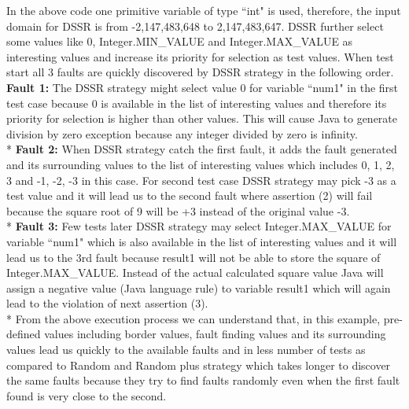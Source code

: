 \documentclass[conference]{IEEEtran}
\begin{document}
\endgroup
In the above code one primitive variable of type ``int" is used, therefore, the input domain for DSSR is from -2,147,483,648 to 2,147,483,647. DSSR further select some values like 0, Integer.MIN\_VALUE and Integer.MAX\_VALUE as interesting values and increase its priority for selection as test values. 
When test start all 3 faults are quickly discovered by DSSR strategy in the following order.\\
\indent \textbf{Fault 1:} The DSSR strategy might select value 0 for variable ``num1"  in the first test case because 0 is available in the list of interesting values and therefore its priority for selection is higher than other values. This will cause Java to generate division by zero exception because any integer divided by zero is infinity.\\*
\indent \textbf{Fault 2:} When DSSR strategy catch the first fault, it adds the fault generated and its surrounding values to the list of interesting values which includes 0, 1, 2, 3 and -1, -2, -3 in this case. For second test case DSSR strategy may pick -3 as a test value and it will lead us to the second fault where assertion (2) will fail because the square root of 9 will be +3 instead of the original value -3.\\*
\indent \textbf{Fault 3:} Few tests later DSSR strategy may select Integer.MAX\_VALUE for variable ``num1" which is also available in the list of interesting values and it will lead us to the 3rd fault because result1 will not be able to store the square of Integer.MAX\_VALUE. Instead of the actual calculated square value Java will assign a negative value (Java language rule) to variable result1 which will again lead to the violation of next assertion (3).\\*
\indent From the above execution process we can understand that, in this example, pre-defined values including border values, fault finding values and its surrounding values lead us quickly to the available faults and in less number of tests as compared to Random and Random plus strategy which takes longer to discover the same faults because they try to find faults randomly even when the first fault found is very close to the second.



\end{document}
